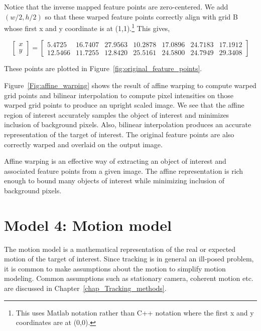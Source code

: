 Notice that the inverse mapped feature points are zero-centered.  We add $(w/2, h/2)$ so that these warped feature points correctly align with grid B whose first x and y coordinate is at (1,1).\footnote{This uses Matlab notation rather than C++ notation where the first x and y coordinates are at (0,0).}  This gives,

\begin{equation*}
\left[\begin{array}{ccc}
x  
\\ 
y
\end{array}
\right]=
\left[
\begin{array}{rrrrrrrrrrr}
   5.4725  & 16.7407 &  27.9563  & 10.2878  & 17.0896 &  24.7183  & 17.1912 \\
   12.5466 &  11.7255 &  12.8420 &   25.5161 &  24.5800  & 24.7949 &   29.3408
\end{array}
\right]
\end{equation*}

These points are plotted in Figure~\ref{fig:original_feature_points}.


Figure~\ref{Fig:affine_warping} shows the result of affine warping to compute warped grid points and bilinear interpolation to compute pixel intensities on those warped grid points to produce an upright scaled image.  We see that the affine region of interest accurately samples the object of interest and minimizes inclusion of background pixels.  Also, bilinear interpolation produces an accurate representation of the target of interest.  The original feature points are also correctly warped and overlaid on the output image.


Affine warping is an effective way of extracting an object of interest and associated feature points from a given image.  The affine representation is rich enough to bound many objects of interest while minimizing inclusion of background pixels.


\section{Model 4: Motion model}
The motion model is a mathematical representation of the real or expected motion of the target of interest.  Since tracking is in general an ill-posed problem, it is common to make assumptions about the motion to simplify motion modeling.  Common assumptions such as stationary camera, coherent motion etc. are discussed in Chapter~\ref{chap_Tracking_methods}.

